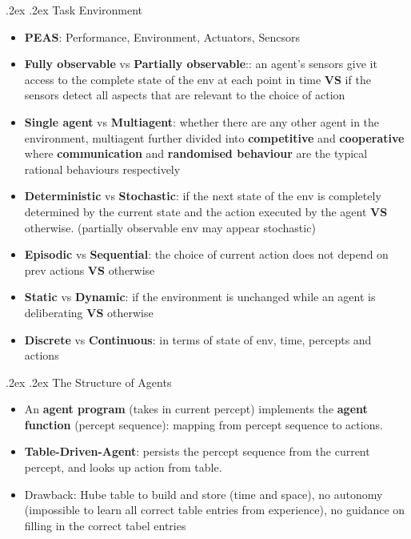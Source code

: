 \documentclass[10pt,landscape,a4paper]{article}
\makeatletter
\renewcommand{\subsection}{\@startsection{subsection}{1}{0mm}%
  {.2ex}%
  {.2ex}%
{\sffamily\bfseries}}
\makeatother
\begin{document}
\begin{multicols*}{4}
  \subsection{Task Environment}
  \begin{itemize}
    \item \textbf{PEAS}: Performance, Environment, Actuators, Sencsors
    \item \textbf{Fully observable} vs \textbf{Partially observable}:: an agent's sensors give it access to the complete state of the env at each point in time \textbf{VS} if the sensors detect all aspects that are relevant to the choice of action
    \item \textbf{Single agent} vs \textbf{Multiagent}: whether there are any other agent in the environment, multiagent further divided into \textbf{competitive} and \textbf{cooperative} where \textbf{communication} and \textbf{randomised behaviour} are the typical rational behaviours respectively
    \item \textbf{Deterministic} vs \textbf{Stochastic}: if the next state of the env is completely determined by the current state and the action executed by the agent \textbf{VS} otherwise. (partially observable env may appear stochastic)
    \item \textbf{Episodic} vs \textbf{Sequential}: the choice of current action does not depend on prev actions \textbf{VS} otherwise
    \item \textbf{Static} vs \textbf{Dynamic}: if the environment is unchanged while an agent is deliberating \textbf{VS} otherwise
    \item \textbf{Discrete} vs \textbf{Continuous}: in terms of state of env, time, percepts and actions
  \end{itemize}
  \subsection{The Structure of Agents}
  \begin{itemize}
    \item An \textbf{agent program} (takes in current percept) implements the \textbf{agent function} (percept sequence): mapping from percept sequence to actions.
    \item \textbf{Table-Driven-Agent}: persists the percept sequence from the current percept, and looks up action from table.
    \item Drawback: Hube table to build and store (time and space), no autonomy (impossible to learn all correct table entries from experience), no guidance on filling in the correct tabel entries
  \end{itemize}

\end{multicols*}
\end{document}
